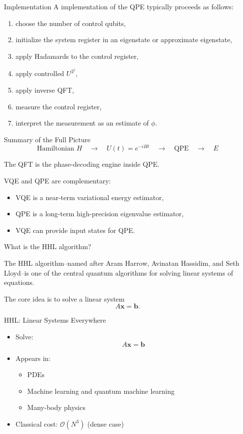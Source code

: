\documentclass{beamer}
\begin{document}
\begin{frame}{Implementation}
A implementation of the QPE typically proceeds as follows:
\begin{enumerate}
\item choose the number of control qubits,
\item initialize the system register in an eigenstate or approximate eigenstate,
\item apply Hadamards to the control register,
\item apply controlled \(U^{2^j}\),
\item apply inverse QFT,
\item measure the control register,
\item interpret the measurement as an estimate of \(\phi\).
\end{enumerate}

\end{frame}

\begin{frame}{Summary of the Full Picture}
\[
\text{Hamiltonian } H
\quad \longrightarrow \quad
U(t)=e^{-iHt}
\quad \longrightarrow \quad
\text{QPE}
\quad \longrightarrow \quad
E
\]

The QFT is the phase-decoding engine inside QPE.

VQE and QPE are complementary:
\begin{itemize}
\item VQE is a near-term variational energy estimator,
\item QPE is a long-term high-precision eigenvalue estimator,
\item VQE can provide input states for QPE.
\end{itemize}
\end{frame}


\begin{frame}{What is the HHL algorithm?}

The HHL algorithm--named after Aram Harrow, Avinatan Hassidim, and Seth
Lloyd--is one of the central quantum algorithms for solving linear
systems of equations.

The core idea is to solve a linear system
\[
A \mathbf{x} = \mathbf{b}.
\]
\end{frame}


\begin{frame}{HHL: Linear Systems Everywhere}
\begin{itemize}
\item Solve:
\[
A \mathbf{x} = \mathbf{b}
\]
\item Appears in:
\begin{itemize}
\item PDEs
\item Machine learning and quantum machine learning
\item Many-body physics
\end{itemize}
\item Classical cost: $\mathcal{O}(N^3)$ (dense case)
\end{itemize}
\end{frame}
\end{document}
